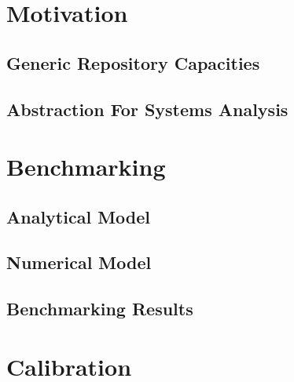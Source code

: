 

\section{Motivation}
\subsection{Generic Repository Capacities}



\subsection{Abstraction For Systems Analysis}


\section{Benchmarking}
\subsection{Analytical Model}

\subsection{Numerical Model}

\subsection{Benchmarking Results}


\section{Calibration}




